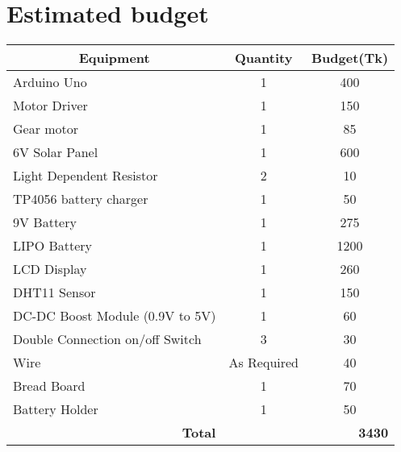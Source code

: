 \section*{Estimated budget}
\begin{table}[H]
\centering
\begin{tabular}{|l|c|c|}
\hline
\multicolumn{1}{|c|}{\textbf{Equipment}} & \textbf{Quantity} & \textbf{Budget(Tk)} \\ \hline
Arduino Uno & 1 & 400 \\ \hline
Motor Driver & 1 & 150 \\ \hline
Gear motor & 1 & 85 \\ \hline
6V Solar Panel & 1 & 600 \\ \hline
Light Dependent Resistor & 2 & 10 \\ \hline
TP4056 battery charger & 1 & 50 \\ \hline
9V Battery & 1 & 275 \\ \hline
LIPO Battery & 1 & 1200 \\ \hline
LCD Display & 1 & 260 \\ \hline
DHT11 Sensor & 1 & 150 \\ \hline
DC-DC Boost Module (0.9V to 5V) & 1 & 60 \\ \hline
Double Connection on/off Switch & 3 & 30 \\ \hline
Wire & As Required & 40 \\ \hline
Bread Board & 1 & 70 \\ \hline
Battery  Holder & 1 & 50 \\ \hline
\multicolumn{1}{|r|}{\textbf{Total}} & \multicolumn{1}{r|}{\textbf{}} & \multicolumn{1}{r|}{\textbf{3430}} \\ \hline
\end{tabular}
\end{table}